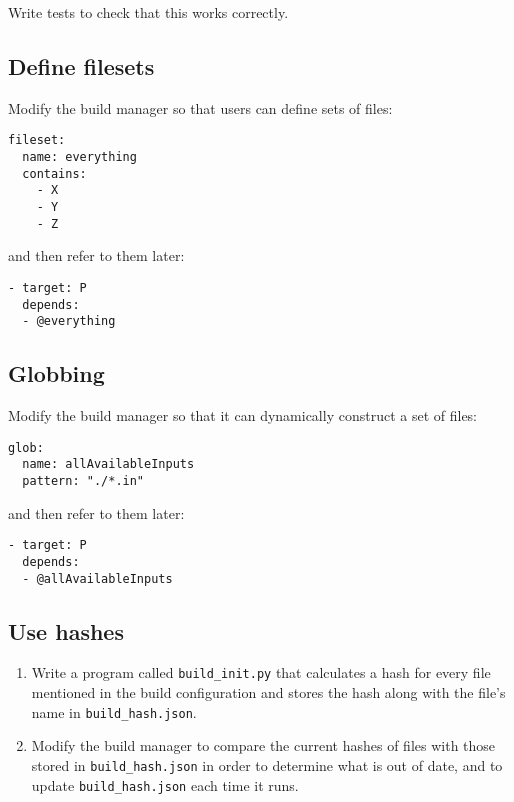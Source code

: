 \documentclass{scrbook}
\begin{document}
Write tests to check that this works correctly.

\subsection*{Define filesets}


Modify the build manager so that users can define sets of files:

\begin{lstlisting}[frame=single,frameround=tttt]
fileset:
  name: everything
  contains:
    - X
    - Y
    - Z
\end{lstlisting}


\noindent and then refer to them later:

\begin{lstlisting}[frame=single,frameround=tttt]
- target: P
  depends:
  - @everything
\end{lstlisting}

\subsection*{Globbing}


Modify the build manager so that it can dynamically construct a set of files:

\begin{lstlisting}[frame=single,frameround=tttt]
glob:
  name: allAvailableInputs
  pattern: "./*.in"
\end{lstlisting}


\noindent and then refer to them later:

\begin{lstlisting}[frame=single,frameround=tttt]
- target: P
  depends:
  - @allAvailableInputs
\end{lstlisting}

\subsection*{Use hashes}

\begin{enumerate}

\item 

Write a program called \texttt{build\_init.py} that calculates a hash
    for every file mentioned in the build configuration
    and stores the hash along with the file's name in \texttt{build\_hash.json}.



\item 

Modify the build manager to compare the current hashes of files
    with those stored in \texttt{build\_hash.json}
    in order to determine what is out of date,
    and to update \texttt{build\_hash.json} each time it runs.



\end{enumerate}
\end{document}
